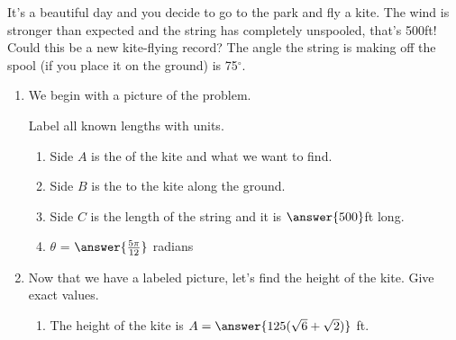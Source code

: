 \documentclass{ximera}
\author{Elizabeth Campolongo}
\begin{document}
\begin{exercise}

It's a beautiful day and you decide to go to the park and fly a kite. The wind is stronger than expected and the string has completely unspooled, that's 500ft! Could this be a new kite-flying record? The angle the string is making off the spool (if you place it on the ground) is 75$^\circ$.


\begin{enumerate}

\item We begin with a picture of the problem. 

		\begin{image}[2in]
		\end{image}

Label all known lengths with units.
\begin{enumerate}
\item Side $A$ is the  of the kite and what we want to find.

\item Side $B$ is the  to the kite along the ground.

\item Side $C$ is the length of the string and it is $\answer{500}$ft long.

\item $\theta$ = $\answer{\frac{5\pi}{12}}$ radians

\end{enumerate}

\item \begin{exercise}
Now that we have a labeled picture, let's find the height of the kite. Give exact values.
\begin{enumerate}
\item The height of the kite is $A = \answer{125(\sqrt{6}+\sqrt{2})}$ ft.


\end{enumerate}
\end{exercise}
\end{enumerate}
\end{exercise}
\end{document}
